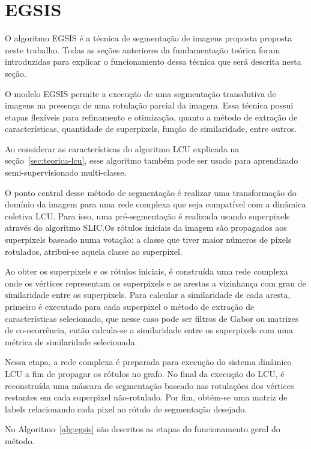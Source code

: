 \section{EGSIS}\label{sec:teorica-egsis}

O algoritmo \gls{EGSIS} é a técnica de segmentação de imagens proposta
proposta neste trabalho. Todas as seções anteriores da fundamentação
teórica foram introduzidas para explicar o funcionamento dessa técnica
que será descrita nesta seção.

O modelo \gls{EGSIS} permite a execução de uma segmentação transdutiva
de imagens na presença de uma rotulação parcial da imagem. Essa
técnica possui etapas flexíveis para refinamento e otimização, quanto
a método de extração de características, quantidade de superpixels,
função de similaridade, entre outros.

Ao considerar as características do algoritmo LCU explicada na
seção~\ref{sec:teorica-lcu}, esse algoritmo também pode ser usado para
aprendizado semi-supervisionado multi-classe.

O ponto central desse método de segmentação é realizar uma
transformação do domínio da imagem para uma rede complexa que seja
compatível com a dinâmica coletiva \gls{LCU}. Para isso, uma
pré-segmentação é realizada usando superpixels através do algoritmo
SLIC.\@ Os rótulos iniciais da imagem são propagados aos superpixels
baseado numa votação: a classe que tiver maior números de pixels
rotulados, atribui-se aquela classe ao superpixel.

Ao obter os superpixels e os rótulos iniciais, é construída uma rede
complexa onde os vértices representam os superpixels e as arestas a
vizinhança com grau de similaridade entre os superpixels. Para
calcular a similaridade de cada aresta, primeiro é executado para cada
superpixel o método de extração de características selecionado, que
nesse caso pode ser filtros de Gabor ou matrizes de co-ocorrência,
então calcula-se a similaridade entre os superpixels com uma métrica
de similaridade selecionada.

Nessa etapa, a rede complexa é preparada para execução do sistema
dinâmico \gls{LCU} a fim de propagar os rótulos no grafo. No final da
execução do \gls{LCU}, é reconstruída uma máscara de segmentação
baseado nas rotulações dos vértices restantes em cada superpixel
não-rotulado. Por fim, obtém-se uma matriz de labels relacionando
cada pixel ao rótulo de segmentação desejado.

No Algoritmo~\ref{alg:egsis} são descritos as etapas do funcionamento
geral do método.

